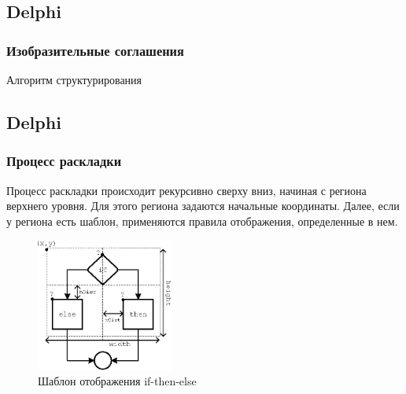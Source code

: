 \documentclass{beamer}
\begin{document}

\subsection{Delphi}
\begin{frame}
\frametitle{Изобразительные соглашения}

\small{
\begin{algorithm}[H]
\SetAlgoLined %
\caption{Алгоритм структурирования}
\label{alg:struct}
\end{algorithm}	
}
\end{frame}


\subsection{Delphi}
\begin{frame}
\frametitle{Процесс раскладки}

\small{Процесс раскладки происходит рекурсивно сверху вниз, начиная с региона верхнего уровня. Для этого региона задаются начальные координаты. Далее, если у региона есть шаблон, применяются правила отображения, определенные в нем.}

\begin{figure}[htbp]
	\centering
		\includegraphics[width=0.4\textwidth]{Pic/IfThenElse.eps}
	\caption{Шаблон отображения if-then-else}
	\label{fig:IfThenElse}
\end{figure}

\end{frame}
\end{document}

